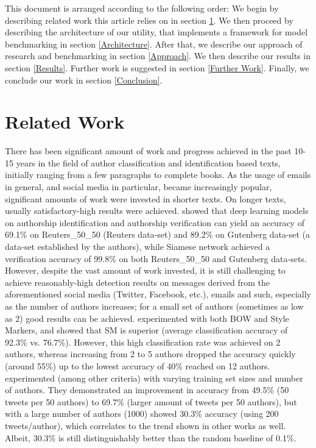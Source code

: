 \documentclass[a4paper]{article}
\begin{document}
This document is arranged according to the following order:
We begin by describing related work this article relies on in section \ref{Related Work}.
We then proceed by describing the architecture of our utility, that implements a framework for model benchmarking in section \ref{Architecture}.
After that, we describe our approach of research and benchmarking in section \ref{Approach}.
We then describe our results in section \ref{Results}.
Further work is suggested in section \ref{Further Work}.
Finally, we conclude our work in section \ref{Conclusion}.
\section{Related Work}
\label{Related Work}

There has been significant amount of work and progress achieved in the past 10-15 years in the field of author classification and identification based texts, initially ranging from a few paragraphs to complete books. As the usage of emails in general, and social media in particular, became increasingly popular, significant amounts of work were invested in shorter texts.
On longer texts, usually satisfactory-high results were achieved. \citep{qian} showed that deep learning models on authorship identification and authorship verification can yield an accuracy of 69.1\% on Reuters\_50\_50 (Reuters data-set) and 89.2\% on Gutenberg data-set (a data-set established by the authors), while Siamese network achieved a verification accuracy of 99.8\% on both Reuters\_50\_50 and Gutenberg data-sets.\\
However, despite the vast amount of work invested, it is still challenging to achieve reasonably-high detection results on messages derived from the aforementioned social media (Twitter, Facebook, etc.), emails and such, especially as the number of authors increases; for a small set of authors (sometimes as low as 2) good results can be achieved. \citep{rachel} experimented with both BOW and Style Markers, and showed that SM is superior (average classification accuracy of 92.3\% vs. 76.7\%). However, this high classification rate was achieved on 2 authors, whereas increasing from 2 to 5 authors dropped the accuracy quickly (around 55\%) up to the lowest accuracy of 40\% reached on 12 authors.
\citep{schwartz} experimented (among other criteria) with varying training set sizes and number of authors. They demonstrated an improvement in accuracy from 49.5\% (50 tweets per 50 authors) to 69.7\% (larger amount of tweets per 50 authors), but with a large number of authors (1000) showed 30.3\% accuracy (using 200 tweets/author), which correlates to the trend shown in other works as well. Albeit, 30.3\% is still  distinguishably better than the random baseline of 0.1\%.
\end{document}
